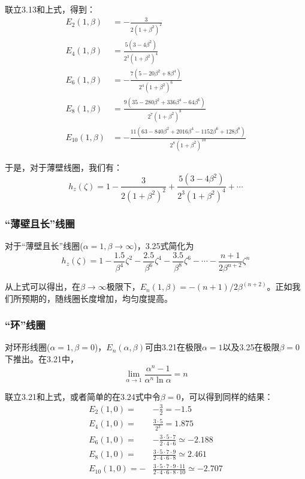 联立3.13和上式，得到：
\begin{subequations}
\begin{align}
E_2(1,\beta) &=-\frac{3}{2(1+\beta^2)^2} \\ 
E_4(1,\beta) &= \frac{5(3-4\beta^2)}{2^3(1+\beta^2)^4} \\ 
E_6(1,\beta) &= -\frac{7(5-20\beta^2+8\beta^4)}{2^4 (1+\beta^2)^6} \\
E_8(1,\beta) &= \frac{9(35-280\beta^2+336\beta^4-64\beta^6)}{2^7(1+\beta^2)^8} \\ E_{10}(1,\beta) &= -\frac{11(63-840\beta^2+2016\beta^4-1152\beta^6+128\beta^8)}{2^8(1+\beta^2)^{10}}
\end{align}
\end{subequations}

于是，对于薄壁线圈，我们有：
\begin{equation}
  h_z(\zeta)=1-\frac{3}{2(1+\beta^2)^2} +\frac{5(3-4\beta^2)}{2^3(1+\beta^2)^4}+\cdots
\end{equation}

\subsubsection{“薄壁且长”线圈}
对于“薄壁且长”线圈($\alpha=1,\beta\rightarrow \infty$)，3.25式简化为
\begin{equation}
  h_z(\zeta)=1-\frac{1.5}{\beta^4}\zeta^2-\frac{2.5}{\beta^6}\zeta^4-\frac{3.5}{\beta^8}\zeta^6-\cdots-\frac{n+1}{2\beta^{n+2}}\zeta^{n}
\end{equation}

从上式可以得出，在$\beta\rightarrow \infty$极限下，$E_n(1,\beta)=-(n+1)/2\beta^{(n+2)}$。正如我们所预期的，随线圈长度增加，均匀度提高。

\subsubsection{“环”线圈}
对环形线圈($\alpha=1,\beta=0$)，$E_n(\alpha,\beta)$可由3.21在极限$\alpha=1$以及3.25在极限$\beta=0$下推出。在3.21中，
\begin{equation}
  \lim_{\alpha\rightarrow 1}\frac{\alpha^n-1}{\alpha^n \ln\alpha}=n
\end{equation}

联立3.21和上式，或者简单的在3.24式中令$\beta=0$，可以得到同样的结果：
\begin{subequations}
\begin{align}
E_2(1,0) =& -\frac{3}{2}=-1.5 \\ 
E_4(1,0) =& \frac{3\cdot 5}{2^3}=1.875 \\ 
E_6(1,0) =& -\frac{3\cdot 5 \cdot 7}{2\cdot 4\cdot 6}\simeq-2.188 \\ 
E_8(1,0) =&\frac{3\cdot 5 \cdot 7\cdot 9}{2\cdot 4\cdot 6\cdot 8}\simeq 2.461 \\ 
E_{10}(1,0) =-&\frac{3\cdot 5 \cdot 7\cdot 9\cdot 11}{2\cdot 4\cdot 6\cdot 8\cdot 10}\simeq -2.707
\end{align}
\end{subequations}

